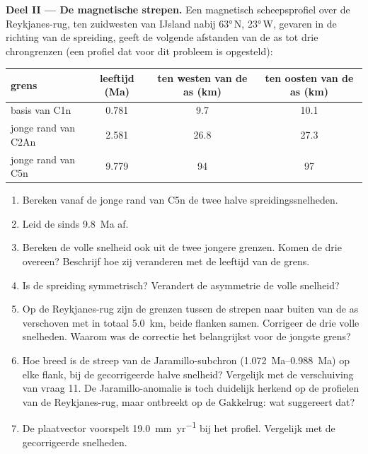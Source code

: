 \begin{problem}
\noindent\textbf{Deel II --- De magnetische strepen.}
Een magnetisch scheepsprofiel over de Reykjanes-rug, ten zuidwesten van IJsland nabij \ang{63}\,N, \ang{23}\,W, gevaren in de richting van de spreiding, geeft de volgende afstanden van de as tot drie chrongrenzen (een profiel dat voor dit probleem is opgesteld):
\begin{center}\small
\begin{tabular}{lccc}
\hline
grens & leeftijd (Ma) & ten westen van de as (km) & ten oosten van de as (km)\\
\hline
basis van C1n & 0.781 & 9.7 & 10.1\\
jonge rand van C2An & 2.581 & 26.8 & 27.3\\
jonge rand van C5n & 9.779 & 94 & 97\\
\hline
\end{tabular}
\end{center}
\begin{enumerate}[resume]
  \item Bereken vanaf de jonge rand van C5n de twee halve spreidingssnelheden.
  \item Leid de  sinds \qty{9.8}{Ma} af.
  \item Bereken de volle snelheid ook uit de twee jongere grenzen. Komen de drie overeen? Beschrijf hoe zij veranderen met de leeftijd van de grens.
  \item Is de spreiding symmetrisch? Verandert de asymmetrie de volle snelheid?
  \item Op de Reykjanes-rug zijn de grenzen tussen de strepen naar buiten van de as verschoven met in totaal \qty{5.0}{km}, beide flanken samen. Corrigeer de drie volle snelheden. Waarom was de correctie het belangrijkst voor de jongste grens?
  \item Hoe breed is de streep van de Jaramillo-subchron (\qtyrange{1.072}{0.988}{Ma}) op elke flank, bij de gecorrigeerde halve snelheid? Vergelijk met de verschuiving van vraag 11. De Jaramillo-anomalie is toch duidelijk herkend op de profielen van de Reykjanes-rug, maar ontbreekt op de Gakkelrug: wat suggereert dat?
  \item De plaatvector voorspelt \qty{19.0}{mm.yr^{-1}} bij het profiel. Vergelijk met de gecorrigeerde snelheden.
\end{enumerate}


\end{problem}
